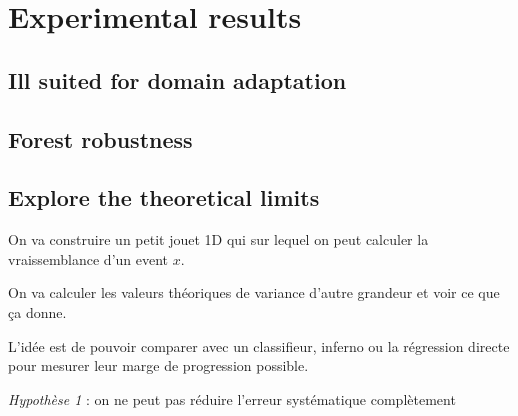 
\chapter{Experimental results}
\label{chap:xp}
\ifpdf
    \graphicspath{{Chapter5/Figs/Raster/}{Chapter5/Figs/PDF/}{Chapter5/Figs/}}
\else
    \graphicspath{{Chapter5/Figs/Vector/}{Chapter5/Figs/}}
\fi


\section{Ill suited for domain adaptation} %
\label{sec:ill_suited_for_domain_adaptation}






\section{Forest robustness} %
\label{sec:forest_robustness}





\section{Explore the theoretical limits}

On va construire un petit jouet 1D qui sur lequel on peut calculer la vraissemblance d'un event $x$.

On va calculer les valeurs théoriques de variance d'autre grandeur et voir ce que ça donne.

L'idée est de pouvoir comparer avec un classifieur, inferno ou la régression directe pour mesurer leur marge de progression possible.

\emph{Hypothèse 1} : on ne peut pas réduire l'erreur systématique complètement

